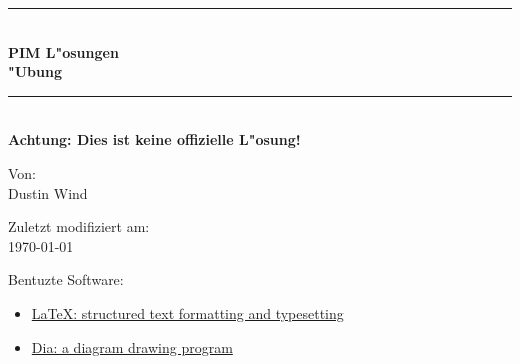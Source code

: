 \documentclass[11pt,oneside,a4wide]{report}
\newcommand{\HRule}{\rule{\linewidth}{0.5mm}}
\begin{document}
\begin{titlepage}
    \begin{center}

    \HRule \\[0.4cm]
    { \huge \bfseries PIM L"osungen\\"Ubung\\[0.4cm] }
    \HRule \\[1.5cm]

    \textbf{Achtung: Dies ist keine offizielle L"osung!}

    \vfill
    Von:\\
    Dustin Wind


   \vfill
    Zuletzt modifiziert am:\\
    {\large \today}\\
    \end{center}
    \bigskip

    {\small
    Bentuzte Software:
    \begin{itemize}
        \item \href{http://www.latex-project.org}{\LaTeX{}: structured text formatting and typesetting}
        \item \href{https://wiki.gnome.org/Apps/Dia/}{Dia: a diagram drawing program}
    \end{itemize}
    }

\end{titlepage}


\tableofcontents

%




\end{document}
